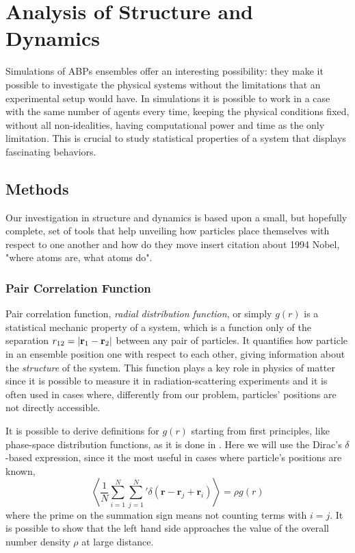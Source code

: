 \documentclass[../../master_thesis_np.tex]{subfiles}
\begin{document}
	\chapter{Analysis of Structure and Dynamics}
	Simulations of ABPs ensembles offer an interesting possibility: they make it possible to investigate the physical systems without the limitations that an experimental setup would have. In simulations it is possible to work in a case with the same number of agents every time, keeping the physical conditions fixed, without all non-idealities, having computational power and time as the only limitation. This is crucial to study statistical properties of a system that displays fascinating behaviors.
	
	\section{Methods}
	Our investigation in structure and dynamics is based upon a small, but hopefully complete, set of tools that help unveiling how particles place themselves with respect to one another and how do they move {\color{blue} insert citation about 1994 Nobel, "where atoms are, what atoms do"}.
	
		\subsection{Pair Correlation Function}
		Pair correlation function, \emph{radial distribution function}, or simply $g(r)$ is a statistical mechanic property of a system, which is a function only of the separation $r_{12} = \abs{\vb{r}_1 - \vb{r}_2}$ between any pair of particles. It quantifies how particle in an ensemble position one with respect to each other, giving information about the \emph{structure} of the system. This function plays a key role in physics of matter since it is possible to measure it in radiation-scattering experiments and it is often used in cases where, differently from our problem, particles' positions are not directly accessible.
		
		It is possible to derive definitions for $g(r)$ starting from first principles, like phase-space distribution functions, as it is done in \cite{hansen90a}. Here we will use the Dirac's $\delta$-based expression, since it the most useful in cases where particle's positions are known,
		\begin{equation}
			\left\langle \frac{1}{N} \sum_{i=1}^{N} \sum_{j=1}^{N}{}' \delta (\mathbf{r} - \mathbf{r}_j + \mathbf{r}_i) \right\rangle = \rho g(r)
		\end{equation}
		where the prime on the summation sign means not counting terms with $i = j$. It is possible to show that the left hand side approaches the value of the overall number density $\rho$ at large distance.
		
\end{document}
